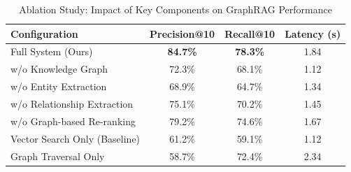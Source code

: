 \begin{table}[h]
\centering
\caption{Ablation Study: Impact of Key Components on GraphRAG Performance}
\label{tab:ablation}
\begin{tabular}{lccc}
\toprule
\textbf{Configuration} & \textbf{Precision@10} & \textbf{Recall@10} & \textbf{Latency (s)} \\
\midrule
Full System (Ours)               & \textbf{84.7\%} & \textbf{78.3\%} & 1.84 \\
\midrule
w/o Knowledge Graph              & 72.3\%          & 68.1\%          & 1.12 \\
w/o Entity Extraction            & 68.9\%          & 64.7\%          & 1.34 \\
w/o Relationship Extraction      & 75.1\%          & 70.2\%          & 1.45 \\
w/o Graph-based Re-ranking       & 79.2\%          & 74.6\%          & 1.67 \\
Vector Search Only (Baseline)    & 61.2\%          & 59.1\%          & 1.12 \\
Graph Traversal Only             & 58.7\%          & 72.4\%          & 2.34 \\
\bottomrule
\end{tabular}
\end{table}

